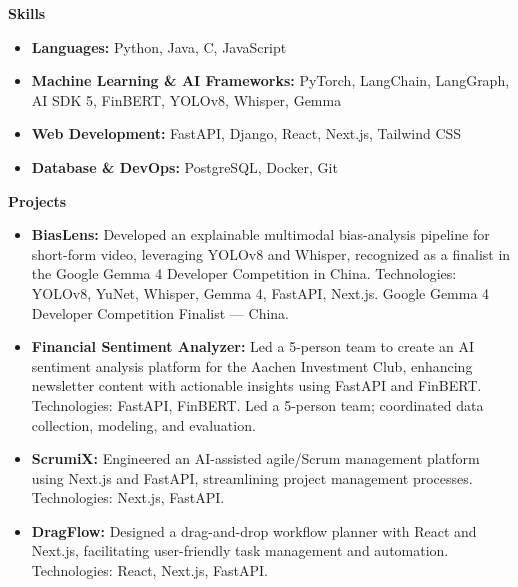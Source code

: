 \documentclass[10pt]{article}
\begin{document}
\vspace{1pt}

\begin{center}
    \textbf{\large Skills}
\end{center}

\begin{itemize}[noitemsep, topsep=0pt, partopsep=0pt, parsep=0pt]
    \item \textbf{Languages:} Python, Java, C, JavaScript
    \item \textbf{Machine Learning \& AI Frameworks:} PyTorch, LangChain, LangGraph, AI SDK 5, FinBERT, YOLOv8, Whisper, Gemma
    \item \textbf{Web Development:} FastAPI, Django, React, Next.js, Tailwind CSS
    \item \textbf{Database \& DevOps:} PostgreSQL, Docker, Git
\end{itemize}

\vspace{1pt}

\begin{center}
    \textbf{\large Projects}
\end{center}

\begin{itemize}[noitemsep, topsep=0pt, partopsep=0pt, parsep=0pt]
    \item \textbf{BiasLens:} Developed an explainable multimodal bias-analysis pipeline for short-form video, leveraging YOLOv8 and Whisper, recognized as a finalist in the Google Gemma 4 Developer Competition in China. Technologies: YOLOv8, YuNet, Whisper, Gemma 4, FastAPI, Next.js. Google Gemma 4 Developer Competition Finalist — China.
    \item \textbf{Financial Sentiment Analyzer:} Led a 5-person team to create an AI sentiment analysis platform for the Aachen Investment Club, enhancing newsletter content with actionable insights using FastAPI and FinBERT. Technologies: FastAPI, FinBERT. Led a 5-person team; coordinated data collection, modeling, and evaluation.
    \item \textbf{ScrumiX:} Engineered an AI-assisted agile/Scrum management platform using Next.js and FastAPI, streamlining project management processes. Technologies: Next.js, FastAPI.
    \item \textbf{DragFlow:} Designed a drag-and-drop workflow planner with React and Next.js, facilitating user-friendly task management and automation. Technologies: React, Next.js, FastAPI.
\end{itemize}
\end{document}
